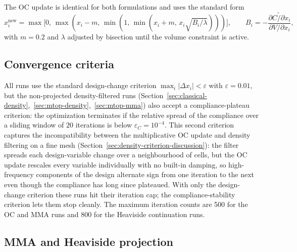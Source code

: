 \documentclass[11pt,a4paper]{article}
\begin{document}
The OC update is identical for both formulations and uses the standard form
\begin{equation}
  x_{i}^{\mathrm{new}}
  = \max\bigl[0,\, \max(x_{i}-m,\,\min(1,\,\min(x_{i}+m,\,x_{i}\sqrt{B_{i}/\lambda})))\bigr],
  \qquad
  B_{i} = -\frac{\widetilde{\partial C/\partial x_{i}}}{\partial V/\partial x_{i}},
  \label{eq:oc-update}
\end{equation}
with $m=0.2$ and $\lambda$ adjusted by bisection until the volume constraint is active.

\subsection{Convergence criteria}\label{sec:convergence}

All runs use the standard design-change criterion $\max_{i}|\Delta x_{i}|<\varepsilon$ with $\varepsilon=0.01$, but the non-projected density-filtered runs (Section~\ref{sec:classical-density},~\ref{sec:mtop-density},~\ref{sec:mtop-mma}) also accept a compliance-plateau criterion: the optimization terminates if the relative spread of the compliance over a sliding window of $20$ iterations is below $\varepsilon_{C}=10^{-4}$. This second criterion captures the incompatibility between the multiplicative OC update and density filtering on a fine mesh (Section~\ref{sec:density-criterion-discussion}): the filter spreads each design-variable change over a neighbourhood of cells, but the OC update rescales every variable individually with no built-in damping, so high-frequency components of the design alternate sign from one iteration to the next even though the compliance has long since plateaued. With only the design-change criterion these runs hit their iteration cap; the compliance-stability criterion lets them stop cleanly. The maximum iteration counts are 500 for the OC and MMA runs and 800 for the Heaviside continuation runs.

\subsection{MMA and Heaviside projection}\label{sec:mma}
\end{document}
